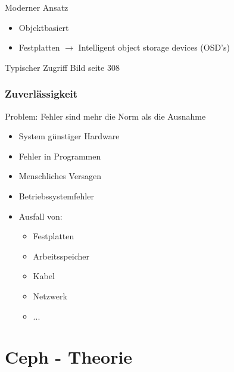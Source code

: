 \documentclass[notes=hide,yellow]{beamer}
\begin{document}
\begin{frame}{Moderner Ansatz}
	\begin{itemize}
		\item Objektbasiert
		\item Festplatten $\rightarrow$ Intelligent object storage devices (OSD's)
	\end{itemize}
\end{frame}

\begin{frame}{Typischer Zugriff}
	Bild seite 308
\end{frame}


\begin{frame}

\end{frame}

\begin{frame}
	\frametitle{Zuverl\"assigkeit}
	Problem: Fehler sind mehr die Norm als die Ausnahme
	\begin{itemize}
		\item System g\"unstiger Hardware
		\item Fehler in Programmen %
		\item Menschliches Versagen %
		\item Betriebssystemfehler %
		\item Ausfall von: 
		\begin{itemize}
			\item Festplatten
			\item Arbeitsspeicher
			\item Kabel
			\item Netzwerk
			\item ...
		\end{itemize}
	\end{itemize}		
\end{frame}


\section{Ceph - Theorie}
\subsection*{}
\begin{frame}

\end{frame}
\end{document}
